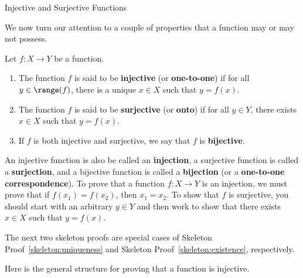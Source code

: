 \begin{section}{Injective and Surjective Functions}

We now turn our attention to a couple of properties that a function may or may not possess.

\begin{definition}
Let $f:X\to Y$ be a function.
\begin{enumerate}[label=\textrm{(\alph*)}]
\item The function $f$ is said to be \textbf{injective} (or \textbf{one-to-one}) if for all $y\in \range(f)$, there is a unique $x\in X$ such that $y=f(x)$.
\item The function $f$ is said to be \textbf{surjective} (or \textbf{onto}) if for all $y\in Y$, there exists $x\in X$ such that $y=f(x)$.
\item If $f$ is both injective and surjective, we say that $f$ is \textbf{bijective}.
\end{enumerate}
\end{definition}

An injective function is also be called an \textbf{injection}, a surjective function is called a \textbf{surjection}, and a bijective function is called a \textbf{bijection} (or a \textbf{one-to-one correspondence}). To prove that a function $f:X\to Y$ is an injection, we must prove that if $f(x_{1})=f(x_{2})$, then $x_{1}=x_{2}$. To show that $f$ is surjective, you should start with an arbitrary $y\in Y$ and then work to show that there exists $x\in X$ such that $y=f(x)$.


The next two skeleton proofs are special cases of Skeleton Proof~\ref{skeleton:uniqueness} and Skeleton Proof~\ref{skeleton:existence}, respectively.

\begin{skeleton}
Here is the general structure for proving that a function is injective.
\begin{center}
\end{center}
\end{skeleton}


\end{section}
